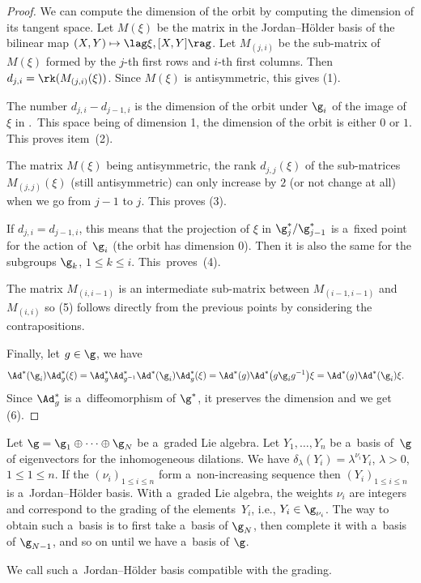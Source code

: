 \begin{proof}
 We can compute the dimension of the orbit by computing the dimension of its tangent space. Let $M(\xi)$ be the matrix in the Jordan--H\"older basis of the bilinear map
 $(X,Y) \mapsto \lag\xi,[X,Y]\rag$.
 Let $M_{(j,i)}$ be the sub-matrix of $M(\xi)$ formed by the $j$-th first rows and $i$-th first columns. Then $d_{j,i} = \rk(M_{(j,i)}(\xi))$. Since $M(\xi)$ is antisymmetric, this gives (1).

 The number $d_{j,i}-d_{j-1,i}$ is the dimension of the orbit under $\g_i$ of the image of $\xi$ in .~This space being of dimension 1, the dimension of the orbit is either $0$ or $1$. This proves item~(2).

 The matrix $M(\xi)$ being antisymmetric, the rank $d_{j,j}(\xi)$ of the sub-matrices $M_{(j,j)}(\xi)$ (still antisymmetric) can only increase by $2$ (or not change at all) when we go from $j-1$ to $j$. This proves (3).

 If $d_{j,i} = d_{j-1,i}$, this means that the projection of $\xi$ in ${\g_j^*}/{\g_{j-1}^*}$ is a~fixed point for the action of~$\g_i$ (the orbit has dimension $0$). Then it is also the same for the subgroups $\g_k$, $1\leq k \leq i$. This~proves~(4).

 The matrix $M_{(i,i-1)}$ is an intermediate sub-matrix between $M_{(i-1,i-1)}$ and $M_{(i,i)}$ so (5) follows directly from the previous points by considering the contrapositions.

 Finally, let $g\in \g$, we have
 \begin{align*}
 \Ad^*(\g_i)\Ad^*_g(\xi) &= \Ad^*_g\Ad^*_{g^{-1}}\Ad^*(\g_i)\Ad^*_g(\xi) = \Ad^*(g)\Ad^*\bigl(g\g_ig^{-1}\bigr)\xi= \Ad^*(g)\Ad^*(\g_i)\xi.
 \end{align*}
 Since $\Ad^*_g$ is a~diffeomorphism of $\g^*$, it preserves the dimension and we get (6).
\end{proof}

\begin{ex}
 Let $\g = \g_1\oplus\cdots\oplus \g_N$ be a~graded Lie algebra. Let $Y_1, \dots, Y_n$ be a~basis of~$\g$ of eigenvectors for the inhomogeneous dilations. We have $\delta_{\lambda}(Y_i) = \lambda^{\nu_i}Y_i$, $\lambda>0$, $1\leq 1 \leq n$. If the $(\nu_i)_{1\leq i \leq n}$ form a~non-increasing sequence then $(Y_i)_{1\leq i \leq n}$ is a~Jordan--H\"older basis. With a~graded Lie algebra, the weights $\nu_i$ are integers and correspond to the grading of the elements~$Y_i$, i.e., $Y_i \in \g_{\nu_i}$. The way to obtain such a~basis is to first take a~basis of $\g_N$, then complete it with a~basis of $\g_{N-1}$, and so on until we have a~basis of $\g$.

 We call such a~Jordan--H\"older basis compatible with the grading.
\end{ex}

